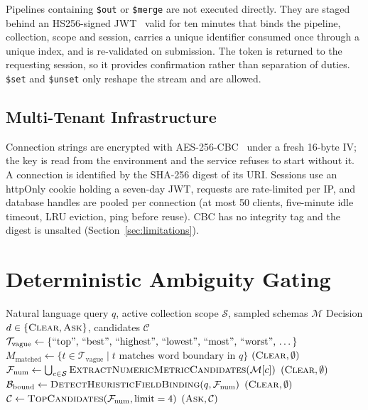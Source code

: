 Pipelines containing \texttt{\$out} or \texttt{\$merge} are not executed directly. They are staged behind an HS256-signed JWT~\cite{jwt2015rfc} valid for ten minutes that binds the pipeline, collection, scope and session, carries a unique identifier consumed once through a unique index, and is re-validated on submission. The token is returned to the requesting session, so it provides confirmation rather than separation of duties. \texttt{\$set} and \texttt{\$unset} only reshape the stream and are allowed.

\subsection{Multi-Tenant Infrastructure}
Connection strings are encrypted with AES-256-CBC~\cite{nist80038a} under a fresh 16-byte IV; the key is read from the environment and the service refuses to start without it. A connection is identified by the SHA-256 digest of its URI. Sessions use an httpOnly cookie holding a seven-day JWT, requests are rate-limited per IP, and database handles are pooled per connection (at most 50 clients, five-minute idle timeout, LRU eviction, ping before reuse). CBC has no integrity tag and the digest is unsalted (Section~\ref{sec:limitations}).

\section{Deterministic Ambiguity Gating}
\label{sec:gate}

\begin{algorithm}[t]
\caption{Deterministic Schema-Grounded Ambiguity Gate}
\label{alg:gate}
\begin{algorithmic}[1]
\Require Natural language query $q$, active collection scope $\mathcal{S}$, sampled schemas $\mathcal{M}$
\Ensure Decision $d \in \{\textsc{Clear}, \textsc{Ask}\}$, candidates $\mathcal{C}$
\State $\mathcal{T}_{\text{vague}} \gets \{\text{``top'', ``best'', ``highest'', ``lowest'', ``most'', ``worst'', \dots}\}$
\State $M_{\text{matched}} \gets \{ t \in \mathcal{T}_{\text{vague}} \mid t \text{ matches word boundary in } q \}$
    \State \Return $(\textsc{Clear}, \emptyset)$
\EndIf
\State $\mathcal{F}_{\text{num}} \gets \bigcup_{c \in \mathcal{S}} \textsc{ExtractNumericMetricCandidates}(\mathcal{M}[c])$
    \State \Return $(\textsc{Clear}, \emptyset)$
\EndIf
\State $\mathcal{B}_{\text{bound}} \gets \textsc{DetectHeuristicFieldBinding}(q, \mathcal{F}_{\text{num}})$
    \State \Return $(\textsc{Clear}, \emptyset)$ 
\EndIf
\State $\mathcal{C} \gets \textsc{TopCandidates}(\mathcal{F}_{\text{num}}, \text{limit}=4)$
\State \Return $(\textsc{Ask}, \mathcal{C})$
\end{algorithmic}
\end{algorithm}

